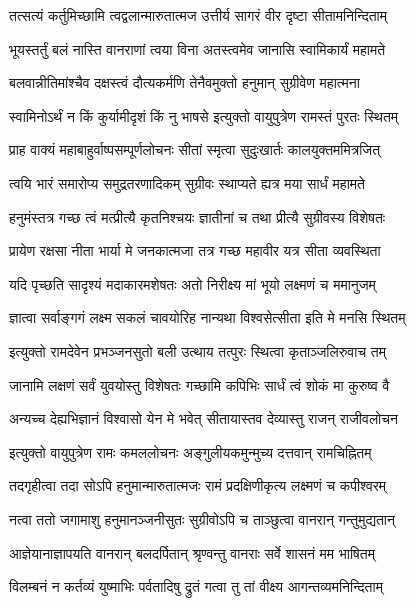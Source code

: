 \twolineshloka
{तत्सत्यं कर्तुमिच्छामि त्वद्वलान्मारुतात्मज}
{उत्तीर्य सागरं वीर दृष्टा सीतामनिन्दिताम्} %

\twolineshloka
{भूयस्तर्तुं बलं नास्ति वानराणां त्वया विना}
{अतस्त्वमेव जानासि स्वामिकार्यं महामते} %

\twolineshloka
{बलवान्नीतिमांश्चैव दक्षस्त्वं दौत्यकर्मणि}
{तेनैवमुक्तो हनुमान् सुग्रीवेण महात्मना} %

\twolineshloka
{स्वामिनोऽर्थं न किं कुर्यामीदृशं किं नु भाषसे}
{इत्युक्तो वायुपुत्रेण रामस्तं पुरतः स्थितम्} %

\twolineshloka
{प्राह वाक्यं महाबाहुर्वाष्पसम्पूर्णलोचनः}
{सीतां स्मृत्वा सुदुःखार्तः कालयुक्तममित्रजित्} %

\twolineshloka
{त्वयि भारं समारोप्य समुद्रतरणादिकम्}
{सुग्रीवः स्थाप्यते ह्यत्र मया सार्धं महामते} %

\twolineshloka
{हनुमंस्तत्र गच्छ त्वं मत्प्रीत्यै कृतनिश्चयः}
{ज्ञातीनां च तथा प्रीत्यै सुग्रीवस्य विशेषतः} %

\twolineshloka
{प्रायेण रक्षसा नीता भार्या मे जनकात्मजा}
{तत्र गच्छ महावीर यत्र सीता व्यवस्थिता} %

\twolineshloka
{यदि पृच्छति सादृश्यं मदाकारमशेषतः}
{अतो निरीक्ष्य मां भूयो लक्ष्मणं च ममानुजम्} %

\twolineshloka
{ज्ञात्वा सर्वाङ्गगं लक्ष्म सकलं चावयोरिह}
{नान्यथा विश्वसेत्सीता इति मे मनसि स्थितम्} %

\twolineshloka
{इत्युक्तो रामदेवेन प्रभञ्जनसुतो बली}
{उत्थाय तत्पुरः स्थित्वा कृताञ्जलिरुवाच तम्} %

\twolineshloka
{जानामि लक्षणं सर्वं युवयोस्तु विशेषतः}
{गच्छामि कपिभिः सार्धं त्वं शोकं मा कुरुष्व वै} %

\twolineshloka
{अन्यच्च देह्यभिज्ञानं विश्वासो येन मे भवेत्}
{सीतायास्तव देव्यास्तु राजन् राजीवलोचन} %

\twolineshloka
{इत्युक्तो वायुपुत्रेण रामः कमललोचनः}
{अङ्गुलीयकमुन्मुच्य दत्तवान् रामचिह्नितम्} %

\twolineshloka
{तदगृहीत्वा तदा सोऽपि हनुमान्मारुतात्मजः}
{रामं प्रदक्षिणीकृत्य लक्ष्मणं च कपीश्वरम्} %

\twolineshloka
{नत्वा ततो जगामाशु हनुमानञ्जनीसुतः}
{सुग्रीवोऽपि च ताञ्छुत्वा वानरान् गन्तुमुद्यतान्} %

\twolineshloka
{आज्ञेयानाज्ञापयति वानरान् बलदर्पितान्}
{श्रृण्वन्तु वानराः सर्वे शासनं मम भाषितम्} %

\twolineshloka
{विलम्बनं न कर्तव्यं युष्माभिः पर्वतादिषु}
{द्रुतं गत्वा तु तां वीक्ष्य आगन्तव्यमनिन्दिताम्} %

